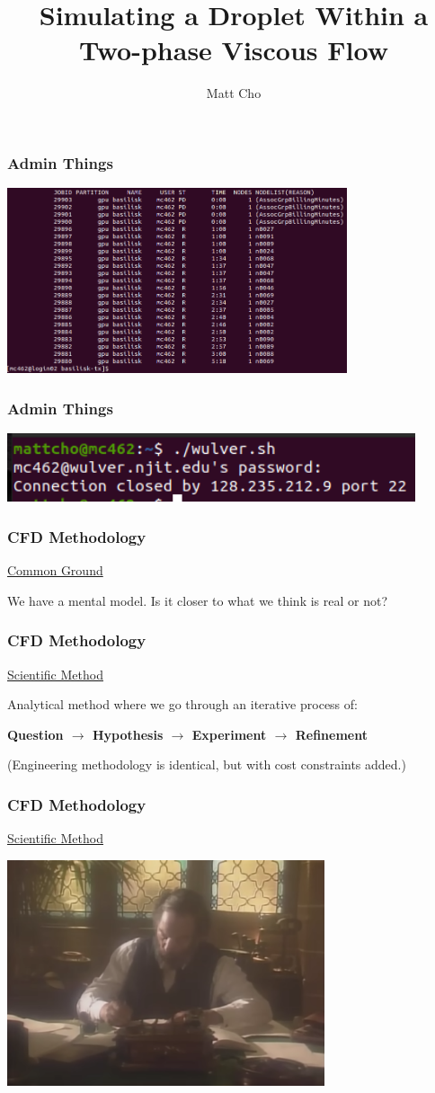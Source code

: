 \documentclass[12pt]{beamer}
\author{Matt Cho}
\title{Simulating a Droplet Within a Two-phase Viscous Flow}
\date{}
\begin{document}
\maketitle

\begin{frame}
    \frametitle{Admin Things}
    \includegraphics[width=0.75\textwidth]{img/8-slurm.png}
\end{frame}
\begin{frame}
    \frametitle{Admin Things}
    \includegraphics[width=0.9\textwidth]{img/9-njit.png}
\end{frame}
\begin{frame}
    \frametitle{CFD Methodology}
    \underline{Common Ground}

    We have a mental model. Is it closer to what we think is real or not?
\end{frame}
\begin{frame}
    \frametitle{CFD Methodology}
    \underline{Scientific Method}

    Analytical method where we go through an iterative process of:

    \textbf{Question $\rightarrow$ Hypothesis $\rightarrow$ Experiment $\rightarrow$ Refinement}

    (Engineering methodology is identical, but with cost constraints added.)
\end{frame}
\begin{frame}
    \frametitle{CFD Methodology}
    \underline{Scientific Method}

    \includegraphics[width=0.7\textwidth]{img/0-caltech-maxwell.png}
\end{frame}
\end{document}
